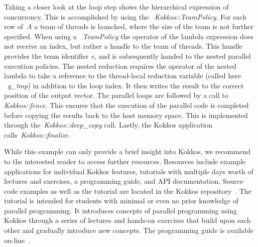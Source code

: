 Taking a closer look at the loop step shows the hierarchical expression of concurrency. This is accomplished by using the ~\emph{Kokkos::TeamPolicy}. For each row of~\emph{A} a team of threads is launched, where the size of the team is not further specified. When using a ~\emph{TeamPolicy} the operator of the lambda expression does not receive an index, but rather a handle to the team of threads. 
This handle provides the team identifier \emph{e}, and is subsequently handed to the nested parallel execution policies. The nested reduction requires the operator of the nested lambda to take a reference to the thread-local reduction variable (called here ~\emph{y\_tmp}) in addition to the loop index. It then writes the result to the correct position of the output vector. 
The parallel loops are followed by a call to \emph{Kokkos::fence}. This ensures that the execution of the parallel code is completed before copying the results back to the host memory space. This is implemented through the~\emph{Kokkos::deep\_copy} call. Lastly, the Kokkos application calls~\emph{Kokkos::finalize}.

While this example can only provide a brief insight into Kokkos, we recommend to the interested reader to access further resources. Resources include example applications for individual Kokkos features, tutorials with multiple days worth of lectures and exercises, a programming guide, and API documentation. Source code examples as well as the tutorial are located in the Kokkos repository~\cite{KOKKOS_REPO}. The tutorial is intended for students with minimal or even no prior knowledge of parallel programming. It introduces concepts of parallel programming using Kokkos through a series of lectures and hands-on exercises that build upon each other and gradually introduce new concepts. The programming guide is available on-line~\cite{KOKKOS_WIKI}. 

